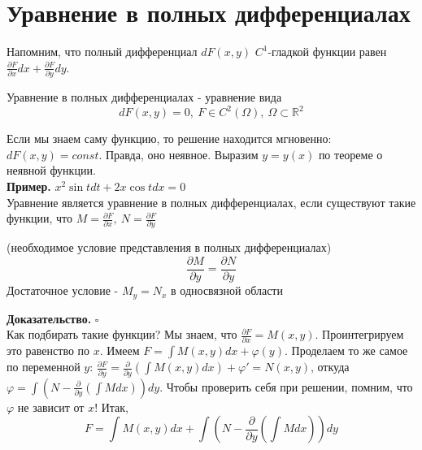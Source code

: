 \section{Уравнение в полных дифференциалах}
Напомним, что полный дифференциал $dF(x,y)$  $C^1$-гладкой функции
равен  $\frac{\partial F}{\partial x} dx+\frac{\partial F}{\partial y}dy$.
\begin{defin}
Уравнение в полных дифференциалах - уравнение вида
$$dF(x,y)=0,~F\in C^2(\Omega),~\Omega\subset \mathbb{R}^2$$
\end{defin}
Если мы знаем саму функцию, то решение находится мгновенно: $dF(x,y)=const$.
Правда, оно неявное. Выразим  $y=y(x)$ по теореме о неявной функции.\\
\textbf{Пример.} $x^2\sin{t}dt+2x\cos{t}dx=0$\\
Уравнение является уравнение в полных дифференциалах, если существуют такие
функции, что $M=\frac{\partial F}{\partial x},~N=\frac{\partial F}{\partial y}$
\begin{theor}
    (необходимое условие представления в полных дифференциалах)\\
    $$\frac{\partial M}{\partial y}=\frac{\partial N}{\partial y}$$ 
    Достаточное условие - $M_y=N_x$ в односвязной области
\end{theor}
\textbf{Доказательство.} $\square$ \\
Как подбирать такие функции? Мы знаем, что $\frac{\partial F}{\partial x}=
M(x,y)$. Проинтегрируем это равенство по $x$. Имеем  $F=\int M(x,y)dx+
\varphi(y)$. Проделаем то же самое по переменной $y$:  $\frac{\partial F}
{\partial y}=\frac{\partial }{\partial y}(\int M(x,y)dx)+\varphi'=N(x,y)$,
откуда $\varphi=\int\left(N-\frac{\partial }{\partial y}(\int Mdx) \right)dy$.
Чтобы проверить себя при решении, помним, что $\varphi$ не зависит от $x$!
Итак,
$$F=\int M(x,y)dx+\int\left(N-\frac{\partial }{\partial y}\left(\int Mdx
\right)\right)dy$$
